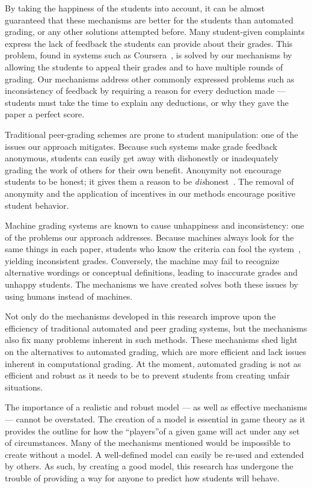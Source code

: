 \documentclass[12pt, Arial]{article}
\begin{document}
By taking the happiness of the students into account, it can be almost guaranteed that these mechanisms are better for the students than automated grading, or any other solutions attempted before. Many student-given complaints express the lack of feedback the students can provide about their grades. This problem, found in systems such as Coursera~\cite{howaccurateispeergrading}, is solved by our mechanisms by allowing the students to appeal their grades and to have multiple rounds of grading. Our mechanisms address other commonly expressed problems such as inconsistency of feedback by requiring a reason for every deduction made --- students must take the time to explain any deductions, or why they gave the paper a perfect score.

Traditional peer-grading schemes are prone to student manipulation: one of the issues our approach mitigates. Because such systems make grade feedback anonymous, students can easily get away with dishonestly or inadequately grading the work of others for their own benefit. Anonymity not encourage students to be honest; it gives them a reason to be \emph{dis}honest~\cite{howaccurateispeergrading}. The removal of anonymity and the application of incentives in our methods encourage positive student behavior.

Machine grading systems are known to cause unhappiness and inconsistency: one of the problems our approach addresses. Because machines always look for the same things in each paper, students who know the criteria can fool the system~\cite{robogradingproblems}, yielding inconsistent grades. Conversely, the machine may fail to recognize alternative wordings or conceptual definitions, leading to inaccurate grades and unhappy students. The mechanisms we have created solves both these issues by using humans instead of machines.

Not only do the mechanisms developed in this research improve upon the efficiency of traditional automated and peer grading systems, but the mechanisms also fix many problems inherent in such methods. These mechanisms shed light on the alternatives to automated grading, which are more efficient and lack issues inherent in computational grading. At the moment, automated grading is not as efficient and robust as it needs to be to prevent students from creating unfair situations.

The importance of a realistic and robust model --- as well as effective mechanisms --- cannot be overstated. The creation of a model is essential in game theory as it provides the outline for how the ``players''of a given game will act under any set of circumstances. Many of the mechanisms mentioned would be impossible to create without a model. A well-defined model can easily be re-used and extended by others. As such, by creating a good model, this research has undergone the trouble of providing a way for anyone to predict how students will behave. 
\end{document}
